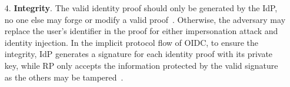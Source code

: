 \begin{itemize}
\item[4.] \textbf{Integrity}. The valid identity proof should only be generated by the IdP, 
no one else may forge or modify a valid proof~\cite{WangZLG16}. 
Otherwise, the adversary may replace the user's identifier in the proof for either impersonation attack and identity injection.
In the implicit protocol flow of OIDC, to ensure the integrity, IdP generates a signature for each identity proof with its private key, while RP  only accepts the information protected by the valid signature as the others may be tampered~\cite{WangCW12, SomorovskyMSKJ12}.
\end{itemize}



